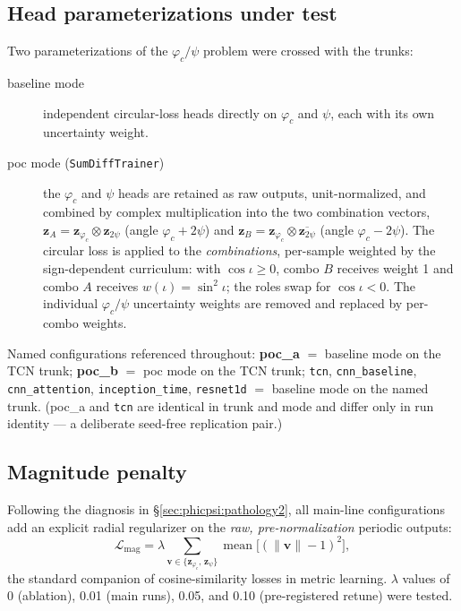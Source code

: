 \subsection{Head parameterizations under test}
\label{sec:phicpsi:modes}

Two parameterizations of the $\varphi_c/\psi$ problem were crossed with the trunks:
\begin{description}
\item[baseline mode] independent circular-loss heads directly on $\varphi_c$ and $\psi$, each with its own uncertainty weight.
\item[poc mode (\texttt{SumDiffTrainer})] the $\varphi_c$ and $\psi$ heads are retained as raw outputs, unit-normalized, and combined by complex multiplication into the two combination vectors, $\mathbf{z}_A = \mathbf{z}_{\varphi_c} \otimes \mathbf{z}_{2\psi}$ (angle $\varphi_c + 2\psi$) and $\mathbf{z}_B = \mathbf{z}_{\varphi_c} \otimes \overline{\mathbf{z}_{2\psi}}$ (angle $\varphi_c - 2\psi$).
The circular loss is applied to the \emph{combinations}, per-sample weighted by the sign-dependent curriculum: with $\cos\iota \ge 0$, combo $B$ receives weight 1 and combo $A$ receives $w(\iota) = \sin^2\iota$; the roles swap for $\cos\iota < 0$.
The individual $\varphi_c/\psi$ uncertainty weights are removed and replaced by per-combo weights.
\end{description}

Named configurations referenced throughout: \textbf{poc\_a} $=$ baseline mode on the TCN trunk; \textbf{poc\_b} $=$ poc mode on the TCN trunk; \texttt{tcn}, \texttt{cnn\_baseline}, \texttt{cnn\_attention}, \texttt{inception\_time}, \texttt{resnet1d} $=$ baseline mode on the named trunk.
(poc\_a and \texttt{tcn} are identical in trunk and mode and differ only in run identity --- a deliberate seed-free replication pair.)

\subsection{Magnitude penalty}
\label{sec:phicpsi:magpen}

Following the diagnosis in \S\ref{sec:phicpsi:pathology2}, all main-line configurations add an explicit radial regularizer on the \emph{raw, pre-normalization} periodic outputs:
\begin{equation}
    \mathcal{L}_{\mathrm{mag}}
    = \lambda \sum_{\mathbf{v} \in \{\mathbf{z}_{\varphi_c},\, \mathbf{z}_{\psi}\}}
    \operatorname{mean}\!\bigl[(\lVert\mathbf{v}\rVert - 1)^2\bigr],
    \label{eq:magpen}
\end{equation}
the standard companion of cosine-similarity losses in metric learning.
$\lambda$ values of 0 (ablation), 0.01 (main runs), 0.05, and 0.10 (pre-registered retune) were tested.


